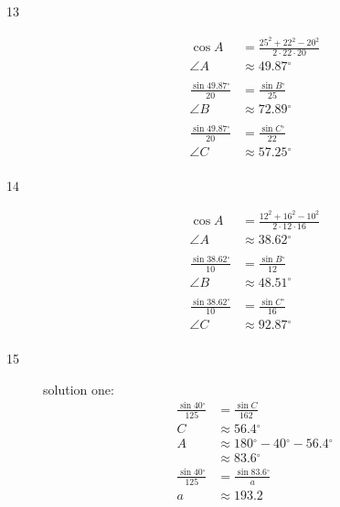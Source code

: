 \documentclass{exam}
\newcommand{\dg}{\ensuremath{^\circ}}
\begin{document}
\begin{description}
      \item[13]
        \begin{align*}
          \cos A &= \frac{25^2 + 22^2 - 20^2}{2 \cdot 22 \cdot 20} \\
          \angle A & \approx \boxed{ 49.87 } \dg \\
          \\
          \frac{\sin 49.87 \dg}{20} &= \frac{\sin B \dg}{25} \\
          \angle B & \approx \boxed{ 72.89 \dg } \\
          \\
          \frac{\sin 49.87 \dg}{20} &= \frac{\sin C \dg}{22} \\
          \angle C & \approx \boxed{ 57.25 \dg } \\
        \end{align*}

      \item[14]
        \begin{align*}
          \cos A   & = \frac{12^2 + 16^2 - 10^2}{2 \cdot 12 \cdot 16} \\
          \angle A & \approx \boxed{ 38.62 \dg } \\
          \\
          \frac{\sin 38.62 \dg}{10} &= \frac{\sin B \dg}{12} \\
          \angle B & \approx \boxed{ 48.51 \dg } \\
          \\
          \frac{\sin 38.62 \dg}{10} &= \frac{\sin C \dg}{16} \\
          \angle C & \approx \boxed{ 92.87 \dg } \\
        \end{align*}

      \item[15]
        solution one:
        \begin{align*}
          \frac{\sin 40 \dg}{125} & = \frac{\sin C}{162} \\
          C                       & \approx \boxed{ 56.4 } \dg \\
          A                       & \approx 180 \dg - 40 \dg - 56.4 \dg \\
                                  & \approx \boxed{ 83.6 } \dg
          \\
          \frac{\sin 40 \dg}{125} & = \frac{\sin 83.6 \dg}{a} \\
          a                       & \approx \boxed{ 193.2 } \\
        \end{align*}


\end{description}
\end{document}
